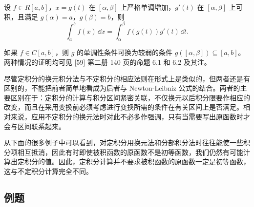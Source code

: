 \begin{xtheorem}[10.4.2（定积分的换元积分法）]
设 $f\in R[a,b]$，$x=g(t)$ 在 $[\alpha,\beta]$ 上严格单调增加，$g'(t)$ 在 $[\alpha,\beta]$ 上可积，且满足 $g(\alpha)=a$，$g(\beta)=b$，则
\[
  \int_a^b f(x)\,\dd x=\int_\alpha^\beta f(g(t))g'(t)\,\dd t.
\]
\end{xtheorem}

\begin{xremark}
如果 $f\in C[a,b]$，则 $g$ 的单调性条件可换为较弱的条件 $g([\alpha,\beta])\subseteq[a,b]$。两种情况的证明均可见 [59] 第二册 140 页的命题 6.1 和 6.2 及其注。
\end{xremark}

\begin{xremark}
尽管定积分的换元积分法与不定积分的相应法则在形式上是类似的，但两者还是有区别的，不能把前者简单地看成为后者与 Newton-Leibniz 公式的结合。两者的主要区别在于：定积分的计算与积分区间紧密关联，不仅换元以后积分限要作相应的改变，而且在采用变换前必须考虑进行变换所需的条件在有关区间上是否满足。相对来说，应用不定积分的换元法时对此不必多作强调，只有当需要写出原函数时才会与区间联系起来。

从下面的很多例子中可以看到，对定积分用换元法和分部积分法时往往能使一些积分项相互抵消，因此有时即使被积函数的原函数不是初等函数，我们仍然有可能计算出定积分的值。因此，定积分计算并不要求被积函数的原函数一定是初等函数，这与不定积分计算完全不同。
\end{xremark}

\subsection{例题}

